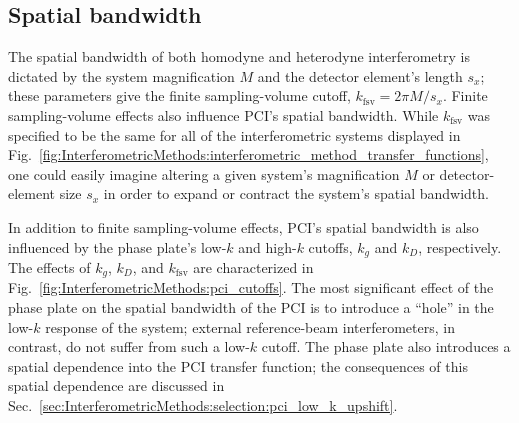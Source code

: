 \subsection{Spatial bandwidth}
The spatial bandwidth of both homodyne and heterodyne interferometry
is dictated by the system magnification $M$ and
the detector element's length $s_x$;
these parameters give the finite sampling-volume cutoff,
$k_{\text{fsv}} = 2 \pi M / s_x$.
Finite sampling-volume effects also influence PCI's spatial bandwidth.
While $k_{\text{fsv}}$ was specified to be the same
for all of the interferometric systems displayed in
Fig.~\ref{fig:InterferometricMethods:interferometric_method_transfer_functions},
one could easily imagine altering
a given system's magnification $M$ or detector-element size $s_x$
in order to expand or contract the system's spatial bandwidth.

In addition to finite sampling-volume effects,
PCI's spatial bandwidth is also influenced by
the phase plate's low-$k$ and high-$k$ cutoffs,
$k_g$ and $k_D$, respectively.
The effects of $k_g$, $k_D$, and $k_{\text{fsv}}$
are characterized in
Fig.~\ref{fig:InterferometricMethods:pci_cutoffs}.
The most significant effect of the phase plate
on the spatial bandwidth of the PCI
is to introduce a ``hole'' in the low-$k$ response of the system;
external reference-beam interferometers, in contrast,
do not suffer from such a low-$k$ cutoff.
The phase plate also introduces a spatial dependence
into the PCI transfer function;
the consequences of this spatial dependence are discussed in
Sec.~\ref{sec:InterferometricMethods:selection:pci_low_k_upshift}.

